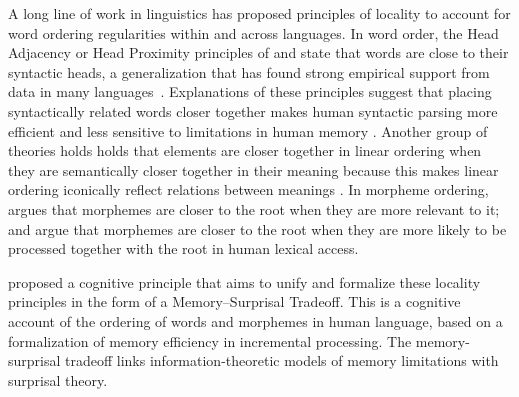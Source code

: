\documentclass[11pt,letterpaper]{article}
\newcommand{\citep}{\parencite}
\newcommand{\citet}{\Textcite}
\newcommand\mhahn[1]{{\color{red}(#1)}}
\newcommand{\jd}[1]{\textcolor{Pink}{[jd: #1]}}
\begin{document}

A long line of work in linguistics has proposed principles of locality to account for word ordering regularities within and across languages.
In word order, the Head Adjacency or Head Proximity principles of \citet{frazier1985syntactic} and \citet{rijkhoff-word-1986} state that words are close to their syntactic heads, a generalization that has found strong empirical support from data in many languages~\citep[e.g.][]{hawkins-performance-1994,liu2008dependency, futrell-large-scale-2015-1, liu-dependency-2017}.
Explanations of these principles suggest that placing syntactically related words closer together makes human syntactic parsing more efficient and less sensitive to limitations in human memory \citep{frazier1985syntactic, gibson1998linguistic, hawkins-efficiency-2003, futrell-noisy-context-2017}.
Another group of theories holds holds that elements are closer together in linear ordering when they are semantically closer together in their meaning because this makes linear ordering iconically reflect relations between meanings \citep{givon1985iconicity}.
In morpheme ordering, \citet{bybee-morphology-1985} argues that morphemes are closer to the root when they are more relevant to it; \citet{hay2002speech} and \citet{plag2002the} argue that morphemes are closer to the root when they are more likely to be processed together with the root in human lexical access.




\citet{Hahn2020modeling} proposed a cognitive principle that aims to unify and formalize these locality principles in the form of a Memory--Surprisal Tradeoff.
This is a cognitive account of the ordering of words and morphemes in human language, based on a formalization of memory efficiency in incremental processing.
The memory-surprisal tradeoff links information-theoretic models of memory limitations with surprisal theory.
\end{document}

